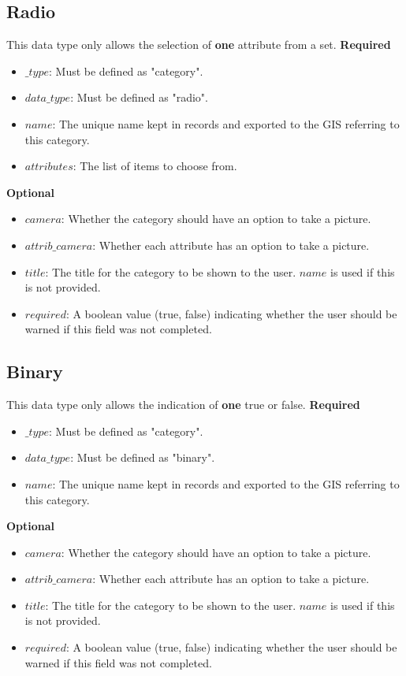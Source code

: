 \documentclass{scrreprt}
\begin{document}
\subsection{Radio}
This data type only allows the selection of \textbf{one} attribute from a set.
\textbf{Required}
\begin{itemize}
\item $\_type$:  Must be defined as "category".
\item $data\_type$: Must be defined as "radio".
\item $name$: The unique name kept in records and exported to the GIS referring to this category.
\item $attributes$: The list of items to choose from.
\end{itemize}
\textbf{Optional}
\begin{itemize}
\item $camera$: Whether the category should have an option to take a picture.
\item $attrib\_camera$: Whether each attribute has an option to take a picture.
\item $title$: The title for the category to be shown to the user. $name$ is used if this is not provided.
\item $required$: A boolean value (true, false) indicating whether the user should be warned if this field was not completed.
\end{itemize}

\newpage
\subsection{Binary}
This data type only allows the indication of \textbf{one} true or false.
\textbf{Required}
\begin{itemize}
\item $\_type$:  Must be defined as "category".
\item $data\_type$: Must be defined as "binary".
\item $name$: The unique name kept in records and exported to the GIS referring to this category.
\end{itemize}
\textbf{Optional}
\begin{itemize}
\item $camera$: Whether the category should have an option to take a picture.
\item $attrib\_camera$: Whether each attribute has an option to take a picture.
\item $title$: The title for the category to be shown to the user. $name$ is used if this is not provided.
\item $required$: A boolean value (true, false) indicating whether the user should be warned if this field was not completed.
\end{itemize}
\end{document}
